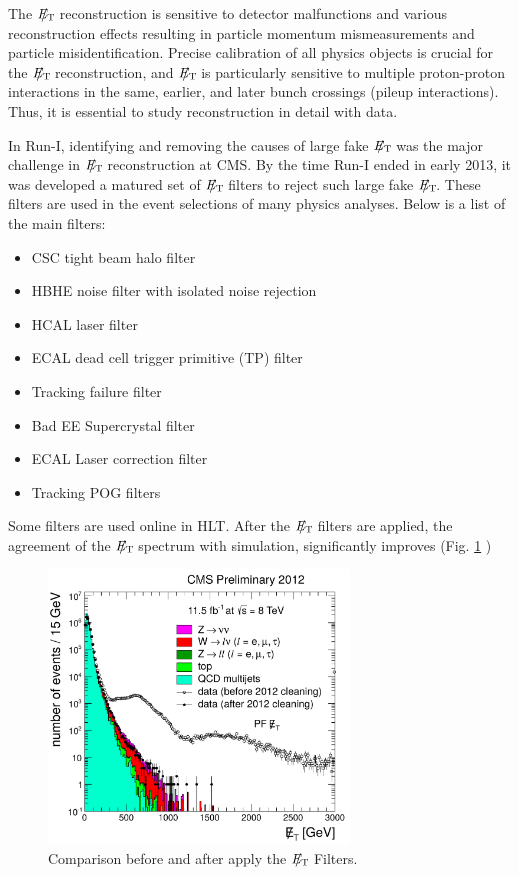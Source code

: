 The $E_{\mathrm{T}}\hspace{-1.1em}/\kern0.45em$ reconstruction is sensitive to detector malfunctions and various reconstruction effects resulting in particle momentum mismeasurements and particle misidentification. Precise calibration of all physics objects is crucial for the $E_{\mathrm{T}}\hspace{-1.1em}/\kern0.45em$ reconstruction, and $E_{\mathrm{T}}\hspace{-1.1em}/\kern0.45em$ is particularly sensitive to multiple proton-proton interactions in the same, earlier, and later bunch crossings (pileup interactions). Thus, it is essential to study reconstruction in detail with data.

In Run-I, identifying and removing the causes of large fake $E_{\mathrm{T}}\hspace{-1.1em}/\kern0.45em$ was the major challenge in $E_{\mathrm{T}}\hspace{-1.1em}/\kern0.45em$ reconstruction at CMS. By the time Run-I ended in early 2013, it was developed a matured set of $E_{\mathrm{T}}\hspace{-1.1em}/\kern0.45em$ filters to reject such large fake $E_{\mathrm{T}}\hspace{-1.1em}/\kern0.45em$. These filters are used in the event selections of many physics analyses. Below is a list of the main filters:
\begin{itemize}
\item 
CSC tight beam halo filter
\item
HBHE noise filter with isolated noise rejection
\item
HCAL laser filter
\item
ECAL dead cell trigger primitive (TP) filter
\item
Tracking failure filter
\item
Bad EE Supercrystal filter
\item
ECAL Laser correction filter
\item
Tracking POG filters
\end{itemize}

Some filters are used online in HLT. After the $E_{\mathrm{T}}\hspace{-1.1em}/\kern0.45em$ filters are applied, the agreement of the $E_{\mathrm{T}}\hspace{-1.1em}/\kern0.45em$ spectrum
with simulation, significantly improves (Fig. \ref{figuremetmiss} )
\begin{figure}[H]
\caption{Comparison before and after apply the $E_{\mathrm{T}}\hspace{-1.1em}/\kern0.45em$ Filters. \label{figuremetmiss}}
  \centering
\includegraphics[width=8cm]{physics_objects_plots/met_missrec}
\end{figure}

